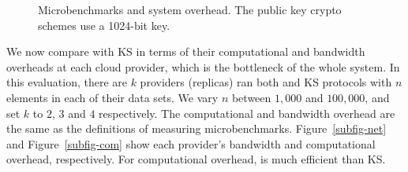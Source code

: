 \begin{figure}[tbp]
{}\hfill {}\vspace{-0.3cm}
\caption{Microbenchmarks and system overhead.  
The public key crypto schemes use a 1024-bit key.} 
\label{fig-bench}
\end{figure}


We now compare \pso with KS in terms of
their computational and bandwidth overheads
at each cloud provider, 
which is the bottleneck of the whole system.
In this evaluation, there are $k$ providers (replicas) ran
both \pso and KS protocols
with $n$ elements in each of their data sets.
We vary $n$ between $1,000$ and $100,000$,
and set $k$ to $2$, $3$ and $4$ respectively.
The computational and bandwidth overhead
are the same as the definitions
of measuring microbenchmarks.
Figure~\ref{subfig-net} and Figure~\ref{subfig-com}
show each provider's bandwidth and
computational overhead, respectively.
For computational overhead, \pso is much efficient than KS.

